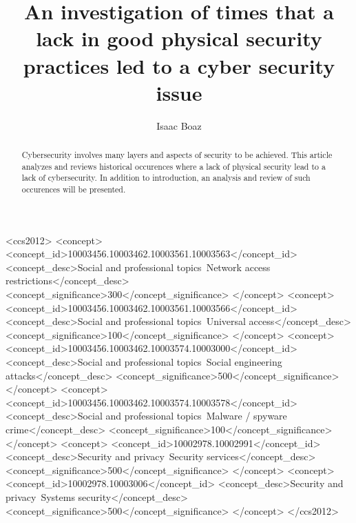 \documentclass[acmsmall]{acmart}
\begin{document}
\title{An investigation of times that a lack in good physical security practices led to a cyber security issue}

\author{Isaac Boaz}

\renewcommand{\shortauthors}{Boaz}

\begin{abstract}
  Cybersecurity involves many layers and aspects of security to be achieved.
  This article analyzes and reviews historical occurences where a lack of
  physical security lead to a lack of cybersecurity. In addition to introduction,
  an analysis and review of such occurences will be presented.
\end{abstract}


\begin{CCSXML}
  <ccs2012>
  <concept>
  <concept_id>10003456.10003462.10003561.10003563</concept_id>
  <concept_desc>Social and professional topics~Network access restrictions</concept_desc>
  <concept_significance>300</concept_significance>
  </concept>
  <concept>
  <concept_id>10003456.10003462.10003561.10003566</concept_id>
  <concept_desc>Social and professional topics~Universal access</concept_desc>
  <concept_significance>100</concept_significance>
  </concept>
  <concept>
  <concept_id>10003456.10003462.10003574.10003000</concept_id>
  <concept_desc>Social and professional topics~Social engineering attacks</concept_desc>
  <concept_significance>500</concept_significance>
  </concept>
  <concept>
  <concept_id>10003456.10003462.10003574.10003578</concept_id>
  <concept_desc>Social and professional topics~Malware / spyware crime</concept_desc>
  <concept_significance>100</concept_significance>
  </concept>
  <concept>
  <concept_id>10002978.10002991</concept_id>
  <concept_desc>Security and privacy~Security services</concept_desc>
  <concept_significance>500</concept_significance>
  </concept>
  <concept>
  <concept_id>10002978.10003006</concept_id>
  <concept_desc>Security and privacy~Systems security</concept_desc>
  <concept_significance>500</concept_significance>
  </concept>
  </ccs2012>
\end{CCSXML}

\end{document}
